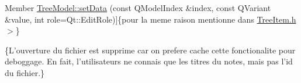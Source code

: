 \begin{DoxyRefList}
\hypertarget{deprecated__deprecated000008}{}%
Member \hyperlink{class_tree_model_acd3341eaa58b720ea4e6d6a415145dbd}{Tree\-Model\-:\-:set\-Data} (const Q\-Model\-Index \&index, const Q\-Variant \&value, int role=Qt\-::\-Edit\-Role)]\{pour la meme raison mentionne dans \hyperlink{_tree_item_8h}{Tree\-Item.\-h}$>$\}  
\item[\label{deprecated__deprecated000009}%
\hypertarget{deprecated__deprecated000009}{}%
Member \hyperlink{class_video_note_factory_ae64d7752275a4c33786db2ea6934c4be}{Video\-Note\-Factory\-:\-:get\-Extension} ()]\{L'ouverture du fichier est supprime car on prefere cache cette fonctionalite pour deboggage. En fait, l'utilisateurs ne connais que les titres du notes, mais pas l'id du fichier.\} 
\end{DoxyRefList}